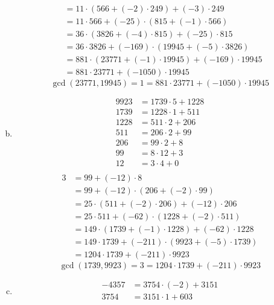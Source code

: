 \documentclass[a4paper,11pt,twocolumn]{article}
\begin{document}
\begin{enumerate}[(a)]
\begin{align*}
            &= 11 \cdot (566 + (-2) \cdot 249) + (-3) \cdot 249 \\
            &= 11 \cdot 566 + (-25) \cdot (815 + (-1) \cdot 566) \\
            &= 36 \cdot (3826 + (-4) \cdot 815) + (-25) \cdot 815 \\
            &= 36 \cdot 3826 + (-169) \cdot (19945 + (-5) \cdot 3826) \\
            &= 881 \cdot (23771 + (-1) \cdot 19945) + (-169) \cdot 19945 \\
            &= 881 \cdot 23771 + (-1050) \cdot 19945
        \end{align*}
        $$ \gcd(23771, 19945) = 1 = 881 \cdot 23771 + (-1050) \cdot 19945 $$
    \item
        \begin{align*}
          9923 &= 1739 \cdot 5 + 1228 \\
          1739 &= 1228 \cdot 1 + 511 \\
          1228 &= 511 \cdot 2 + 206 \\
          511 &= 206 \cdot 2 + 99 \\
          206 &= 99 \cdot 2 + 8 \\
          99 &= 8 \cdot 12 + 3 \\
          12 &= 3 \cdot 4 + 0 \\
        \end{align*}
        \begin{align*}
          3 &= 99 + (-12) \cdot 8 \\
            &= 99 + (-12) \cdot (206 + (-2) \cdot 99) \\
            &= 25 \cdot (511 + (-2) \cdot 206) + (-12) \cdot 206 \\
            &= 25 \cdot 511 + (-62) \cdot (1228 + (-2) \cdot 511) \\
            &= 149 \cdot (1739 + (-1) \cdot 1228) + (-62) \cdot 1228 \\
            &= 149 \cdot 1739 + (-211) \cdot (9923 + (-5) \cdot 1739) \\
            &= 1204 \cdot 1739 + (-211) \cdot 9923
        \end{align*}
        $$ \gcd(1739, 9923) = 3 = 1204 \cdot 1739 + (-211) \cdot 9923 $$
    \item 
        \begin{align*}
          -4357 &= 3754 \cdot (-2) + 3151 \\
          3754 &= 3151 \cdot 1 + 603 \\

\end{align*}
\end{enumerate}
\end{document}
